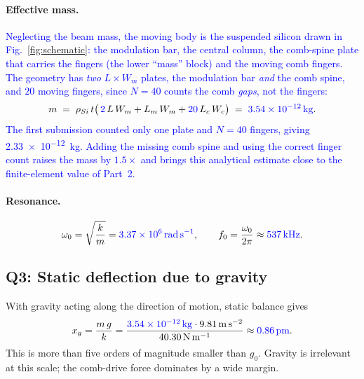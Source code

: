 \paragraph{Effective mass.}
\textcolor{blue}{Neglecting the beam mass, the moving body is the suspended
silicon drawn in Fig.~\ref{fig:schematic}: the modulation bar, the central
column, the comb-spine plate that carries the fingers (the lower ``mass''
block) and the moving comb fingers. The geometry has \emph{two}
$L\times W_{m}$ plates, the modulation bar \emph{and} the comb spine, and
$20$ moving fingers, since $N=40$ counts the comb \emph{gaps}, not the
fingers:}
\begin{equation}
  m \;=\; \rho_{Si}\,t\bigl(\,\textcolor{blue}{2}\,L\,W_{m} + L_{m}\,W_{m}
        + \textcolor{blue}{20}\,L_{c}\,W_{c}\bigr)
        \;=\; \textcolor{blue}{\SI{3.54e-12}{\kilo\gram}}.
\end{equation}
\textcolor{blue}{The first submission counted only one plate and $N=40$
fingers, giving \SI{2.33e-12}{\kilo\gram}. Adding the missing comb spine and
using the correct finger count raises the mass by $1.5\times$ and brings this
analytical estimate close to the finite-element value of Part~2.}

\paragraph{Resonance.}
\begin{equation}
  \omega_{0}=\sqrt{\frac{k}{m}}=\textcolor{blue}{\SI{3.37e6}{\radian\per\second}},
  \qquad
  f_{0}=\frac{\omega_{0}}{2\pi}\approx \textcolor{blue}{\SI{537}{\kilo\hertz}}.
\end{equation}

\subsection*{Q3: Static deflection due to gravity}

With gravity acting along the direction of motion, static balance gives
\begin{equation}
  x_{g}=\frac{m\,g}{k}
       =\frac{\textcolor{blue}{\SI{3.54e-12}{\kilo\gram}}\cdot\SI{9.81}{\meter\per\second\squared}}
              {\SI{40.30}{\newton\per\meter}}
       \approx \textcolor{blue}{\SI{0.86}{\pico\meter}}.
\end{equation}
This is more than five orders of magnitude smaller than $g_{0}$. Gravity is
irrelevant at this scale; the comb-drive force dominates by a wide margin.
